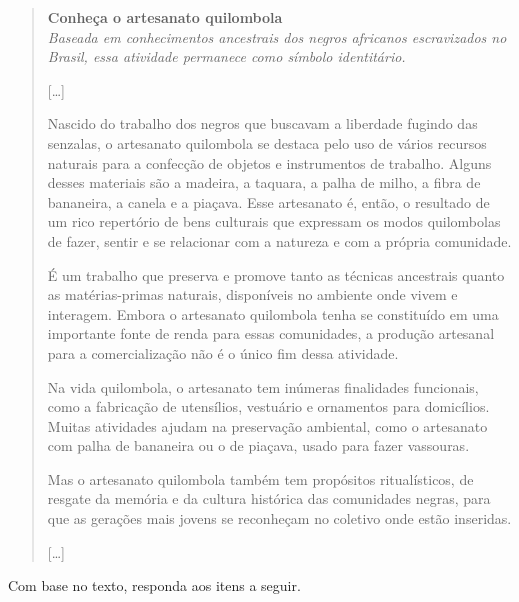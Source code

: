 \begin{quote}
\textbf{Conheça o artesanato quilombola}\\
\textit{Baseada em conhecimentos ancestrais dos negros africanos escravizados no Brasil, essa atividade permanece como símbolo identitário.}

{[}\ldots{}{]}

Nascido do trabalho dos negros que buscavam a liberdade fugindo das
senzalas, o artesanato quilombola se destaca pelo uso de vários recursos
naturais para a confecção de objetos e instrumentos de trabalho. Alguns
desses materiais são a madeira, a taquara, a palha de milho, a fibra de
bananeira, a canela e a piaçava. Esse artesanato é, então, o resultado
de um rico repertório de bens culturais que expressam os modos
quilombolas de fazer, sentir e se relacionar com a natureza e com a
própria comunidade.

É um trabalho que preserva e promove tanto as técnicas ancestrais quanto
as matérias-primas naturais, disponíveis no ambiente onde vivem e
interagem. Embora o artesanato quilombola tenha se constituído em uma
importante fonte de renda para essas comunidades, a produção artesanal
para a comercialização não é o único fim dessa atividade.

Na vida quilombola, o artesanato tem inúmeras finalidades funcionais,
como a fabricação de utensílios, vestuário e ornamentos para domicílios.
Muitas atividades ajudam na preservação ambiental, como o artesanato com
palha de bananeira ou o de piaçava, usado para fazer vassouras.

Mas o artesanato quilombola também tem propósitos ritualísticos, de
resgate da memória e da cultura histórica das comunidades negras, para
que as gerações mais jovens se reconheçam no coletivo onde estão
inseridas.

{[}\ldots{}{]}

\end{quote}

Com base no texto, responda aos itens a seguir.

